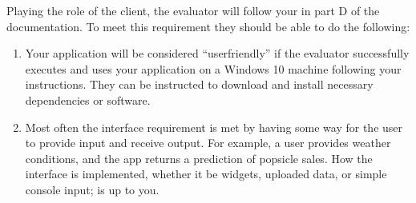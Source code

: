 \documentclass[letterpaper,10pt,english]{jupyterBook}
\begin{document}
\sphinxAtStartPar
Playing the role of the client, the evaluator will follow your {\hyperref[\detokenize{task2_doc/task2_doc_d:task2-doc-d-user-guide}]{}} in part D of the documentation. To meet this requirement they should be able to do the following:
\begin{enumerate}
%
\item {} 
\sphinxAtStartPar
{} Your application will be considered “user\sphinxhyphen{}friendly” if the evaluator successfully executes and uses your application on a Windows 10 machine following your instructions. They can be instructed to download and install necessary dependencies or software.

\item {} 
\sphinxAtStartPar
{} Most often the interface requirement is met by having some way for the user to provide input and receive output. For example, a user provides weather conditions, and the app returns a prediction of popsicle sales. How the interface is implemented, whether it be widgets, uploaded data, or simple console input; is up to you.

\end{enumerate}
\end{document}

